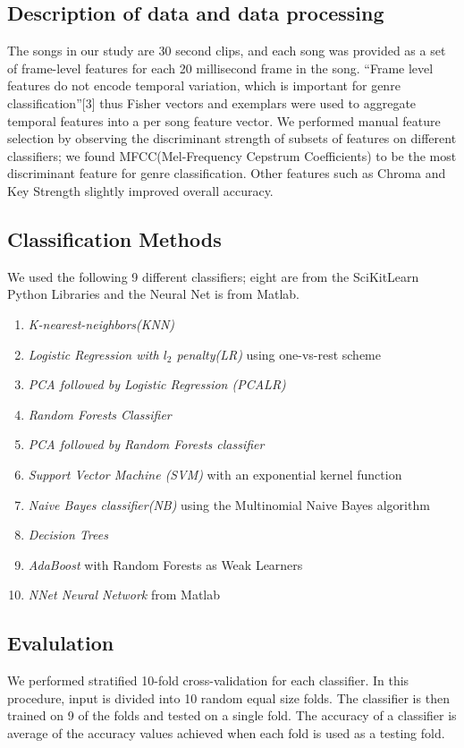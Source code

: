 \documentclass{article}
\begin{document}
\begin{multicols}{2}
\subsection{Description of data and data processing}
The songs in our study are 30 second clips, and each song was provided as a set of frame-level features for each 20 millisecond frame in the song. ``Frame level features do not encode temporal variation, which is important for genre classification''[3] thus Fisher vectors and exemplars were used to aggregate temporal features into a per song feature vector. 
We performed manual feature selection by observing the discriminant strength of subsets of features on different classifiers; we found MFCC(Mel-Frequency Cepstrum Coefficients) to be the most discriminant feature for genre classification. Other features such as Chroma and Key Strength slightly improved overall accuracy.

\subsection{Classification Methods}
We used the following 9 different classifiers; eight are from the SciKitLearn Python Libraries and the Neural Net is from Matlab. 
\begin{enumerate}
    \item \textit{K-nearest-neighbors(KNN)} 
    \item \textit{Logistic Regression with $l_2$ penalty(LR)} using one-vs-rest scheme 
    \item \textit{PCA followed by Logistic Regression (PCALR)}
    \item \textit{Random Forests Classifier}
    \item \textit{PCA followed by Random Forests classifier}
    \item \textit{Support Vector Machine (SVM)} with an exponential kernel function
    \item \textit{Naive Bayes classifier(NB)} using the Multinomial Naive Bayes algorithm
    \item \textit{Decision Trees} 
    \item \textit{AdaBoost} with Random Forests as Weak Learners
    \item \textit{NNet Neural Network} from Matlab
\end{enumerate}
 
\subsection{Evalulation}
We performed stratified 10-fold cross-validation for each classifier. In this procedure, input is divided into 10 random equal size folds. The classifier is then trained on 9 of the folds and tested on a single fold. The accuracy of a classifier is average of the accuracy values achieved when each fold is used as a testing fold.


\end{multicols}
\end{document}
